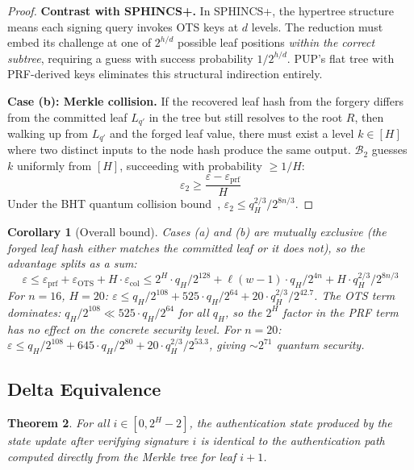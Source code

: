 \documentclass[11pt]{article}
\newtheorem{theorem}{Theorem}
\newtheorem{corollary}[theorem]{Corollary}
\begin{document}
\begin{proof}
\textbf{Contrast with SPHINCS+.} In SPHINCS+, the hypertree
structure means each signing query invokes OTS keys at $d$ levels.
The reduction must embed its challenge at one of $2^{h/d}$ possible
leaf positions \emph{within the correct subtree}, requiring a guess
with success probability $1/2^{h/d}$. PUP's flat tree with
PRF-derived keys eliminates this structural indirection entirely.

\textbf{Case (b): Merkle collision.}
If the recovered leaf hash from the forgery differs from the committed
leaf $L_{q'}$ in the tree but still resolves to the root $R$, then
walking up from $L_{q'}$ and the forged leaf value, there must exist
a level $k \in [H]$ where two distinct inputs to the node hash
produce the same output. $\mathcal{B}_2$ guesses $k$ uniformly from
$[H]$, succeeding with probability $\geq 1/H$:
\[
\varepsilon_2 \geq \frac{\varepsilon - \varepsilon_{\mathrm{prf}}}{H}
\]
Under the BHT quantum collision bound~\cite{bht},
$\varepsilon_2 \leq q_H^{2/3} / 2^{8n/3}$.
\end{proof}

\begin{corollary}[Overall bound]\label{cor:overall}
Cases (a) and (b) are mutually exclusive (the forged leaf hash either
matches the committed leaf or it does not), so the advantage splits as
a sum:
\[
\varepsilon \leq \varepsilon_{\mathrm{prf}} +
\varepsilon_{\mathrm{OTS}} +
H \cdot \varepsilon_{\mathrm{col}}
\leq 2^H \cdot q_H / 2^{128} + \ell(w-1) \cdot q_H / 2^{4n}
+ H \cdot q_H^{2/3} / 2^{8n/3}
\]
For $n = 16$, $H = 20$: $\varepsilon \leq q_H / 2^{108} + 525 \cdot
q_H / 2^{64} + 20 \cdot q_H^{2/3} / 2^{42.7}$. The OTS term dominates:
$q_H / 2^{108} \ll 525 \cdot q_H / 2^{64}$ for all $q_H$, so the
$2^H$ factor in the PRF term has no effect on the concrete security
level. For $n = 20$: $\varepsilon \leq q_H / 2^{108} + 645 \cdot
q_H / 2^{80} + 20 \cdot q_H^{2/3} / 2^{53.3}$, giving ${\sim}2^{71}$
quantum security.
\end{corollary}

\subsection{Delta Equivalence}

\begin{theorem}\label{thm:delta}
For all $i \in [0, 2^H - 2]$, the authentication state produced by the
state update after verifying signature $i$ is identical to the
authentication path computed directly from the Merkle tree for leaf
$i + 1$.
\end{theorem}
\end{document}
